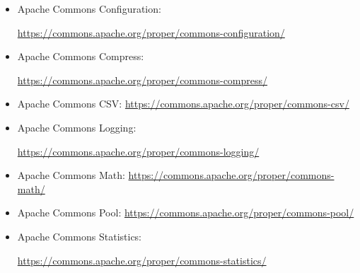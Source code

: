 \begin{itemize}
    \item Apache Commons Configuration:

    \url{https://commons.apache.org/proper/commons-configuration/}
    \item Apache Commons Compress:

    \url{https://commons.apache.org/proper/commons-compress/}
    \item Apache Commons CSV: \url{https://commons.apache.org/proper/commons-csv/}
    \item Apache Commons Logging:

    \url{https://commons.apache.org/proper/commons-logging/}
    \item Apache Commons Math: \url{https://commons.apache.org/proper/commons-math/}
    \item Apache Commons Pool: \url{https://commons.apache.org/proper/commons-pool/}
    \item Apache Commons Statistics:

    \url{https://commons.apache.org/proper/commons-statistics/}
\end{itemize}
